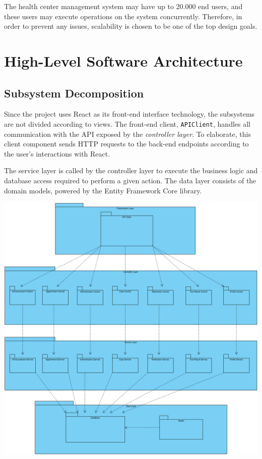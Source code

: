 \documentclass[a4paper, 12pt, titlepage]{article}
\begin{document}
  The health center management system may have up to 20.000 end users, and these users may execute operations on the system concurrently.
  Therefore, in order to prevent any issues, scalability is chosen to be one of the top design goals.

  \section{High-Level Software Architecture}

  \subsection{Subsystem Decomposition}

  Since the project uses React as its front-end interface technology, the subsystems are not divided according to views.
  The front-end client, \texttt{APIClient}, handles all communication with the API exposed by the \textit{controller layer}.
  To elaborate, this client component sends HTTP requests to the back-end endpoints according to the user's interactions with React.

  The service layer is called by the controller layer to execute the business logic and database access required to perform a given action.
  The data layer consists of the domain models, powered by the Entity Framework Core library.

  \includegraphics[width=\linewidth]{subsystem}
\end{document}
